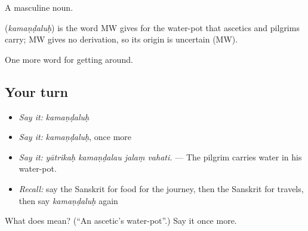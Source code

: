 A masculine noun.

\begin{cousinweb}
\textbf{} (\emph{kamaṇḍaluḥ}) is the word MW gives for the water-pot that ascetics and pilgrims carry; MW gives no derivation, so its origin is uncertain (MW).
\end{cousinweb}

\begin{grammarlens}[title={What you've built}]
One more word for getting around.
\end{grammarlens}

\subsection*{Your turn}
\begin{itemize}
\raggedright
  \item \emph{Say it:} \emph{kamaṇḍaluḥ}
  \item \emph{Say it:} \emph{kamaṇḍaluḥ}, once more
  \item \emph{Say it:} \emph{yātrikaḥ kamaṇḍalau jalaṃ vahati.} — The pilgrim carries water in his water-pot.
  \item \emph{Recall:} say the Sanskrit for food for the journey, then the Sanskrit for travels, then say \emph{kamaṇḍaluḥ} again
\end{itemize}

\begin{tcolorbox}[breakable,colback=teal!4,colframe=teal!35!black,title={Before you move on}]
What does  mean? (\textquotedblleft{}An ascetic's water-pot\textquotedblright{}.) Say it once more.
\end{tcolorbox}
